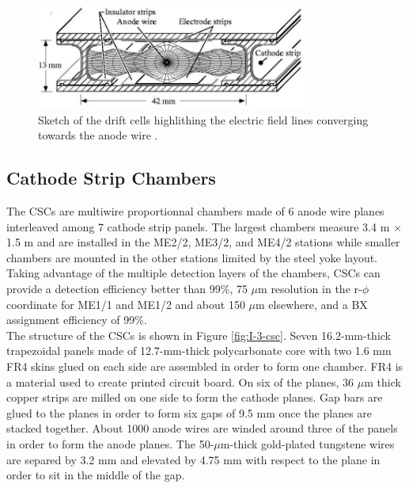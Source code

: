       \begin{figure}[h!]
        \centering
        \includegraphics[width=0.8\textwidth]{img/I-3-cms/dt.jpg}
        \caption{Sketch of the drift cells highlithing the electric field lines converging towards the anode wire \cite{1748-0221-3-08-S08004}.}
        \label{fig:I-3-dt}
      \end{figure}

  	\subsection{Cathode Strip Chambers}

      The CSCs are multiwire proportionnal chambers made of 6 anode wire planes interleaved among 7 cathode strip panels. The largest chambers measure 3.4 m $ \times $ 1.5 m and are installed in the ME2/2, ME3/2, and ME4/2 stations while smaller chambers are mounted in the other stations limited by the steel yoke layout. Taking advantage of the multiple detection layers of the chambers, CSCs can provide a detection efficiency better than 99\%, 75 $\mu$m resolution in the r-$\phi$ coordinate for ME1/1 and ME1/2 and about 150 $\mu$m elsewhere, and a BX assignment efficiency of 99\%. \\

      The structure of the CSCs is shown in Figure \ref{fig:I-3-csc}. Seven 16.2-mm-thick trapezoidal panels made of 12.7-mm-thick polycarbonate core with two 1.6 mm FR4 skins glued on each side are assembled in order to form one chamber. FR4 is a material used to create printed circuit board. On six of the planes, 36 $\mu$m thick copper strips are milled on one side to form the cathode planes. Gap bars are glued to the planes in order to form six gaps of 9.5 mm once the planes are stacked together. About 1000 anode wires are winded around three of the panels in order to form the anode planes. The 50-$\mu$m-thick gold-plated tungstene wires are separed by 3.2 mm and elevated by 4.75 mm with respect to the plane in order to sit in the middle of the gap.

